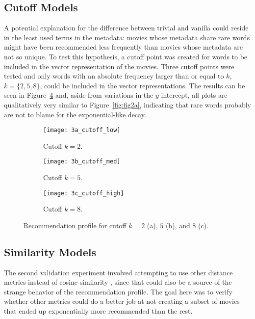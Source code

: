 \subsection{Cutoff Models}
\label{subsec:cutoff}

A potential explanation for the difference between trivial and vanilla could
reside in the least used terms in the metadata: movies whose metadata share rare
words might have been recommended less frequently than movies whose metadata are
not so unique. To test this hypothesis, a cutoff point was created for words to
be included in the vector representation of the movies. Three cutoff points were
tested and only words with an absolute frequency larger than or equal to $k$, $k
= \{2, 5, 8\}$, could be included in the vector representations. The results can
be seen in Figure~\ref{fig:fig3} and, aside from variations in the
$y$-intercept, all plots are qualitatively very similar to
Figure~\ref{fig:fig2a}, indicating that rare words probably are not to blame for
the exponential-like decay.

\begin{figure}
  \centering
  \begin{subfigure}{0.3\textwidth}
    \centering
    \texttt{[image: 3a\_cutoff\_low]}
    \caption{Cutoff $k = 2$.\label{fig:fig3a}}
  \end{subfigure}
  \begin{subfigure}{0.3\textwidth}
    \centering
    \texttt{[image: 3b\_cutoff\_med]}
    \caption{Cutoff $k = 5$.\label{fig:fig3b}}
  \end{subfigure}
  \begin{subfigure}{0.3\textwidth}
    \centering
    \texttt{[image: 3c\_cutoff\_high]}
    \caption{Cutoff $k = 8$.\label{fig:fig3c}}
  \end{subfigure}
  \caption{Recommendation profile for cutoff $k = 2$ (a), $5$ (b), and $8$
    (c).\label{fig:fig3}}
\end{figure}

\subsection{Similarity Models}
\label{subsec:similarity}

The second validation experiment involved attempting to use other distance
metrics instead of cosine similarity \citep{ricci_introduction_2011}, since that
could also be a source of the strange behavior of the recommendation profile.
The goal here was to verify whether other metrics could do a better job at not
creating a subset of movies that ended up exponentially more recommended than
the rest.

